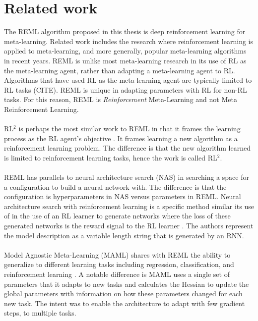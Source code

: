 \chapter{Related work}
\label{ch2}

\minitoc 
The REML algorithm proposed in this thesis is deep reinforcement 
learning for meta-learning. 
Related work includes the research where reinforcement learning is applied to 
meta-learning, and more generally, popular meta-learning algorithms in recent years. 
REML is unlike most meta-learning research in its use of RL as the meta-learning agent,
rather than adapting a meta-learning agent to RL. Algorithms that have used
RL as the meta-learning agent are typically limited to RL tasks (CITE). REML is 
unique in adapting parameters with RL for non-RL tasks. For this reason, REML is 
\textit{Reinforcement} Meta-Learning and not Meta Reinforcement Learning. 
\\\\
RL$^2$ is perhaps the most similar work to REML in that it frames the learning process
as the RL agent's objective \cite{DuaSchCheBarSutAbb:16}. It frames learning a new 
algorithm as a reinforcement learning problem. 
The difference is that the new algorithm learned is limited to reinforcement learning 
tasks, hence the work is called RL$^2$.
\\\\ 
REML has parallels to neural architecture search (NAS) in searching a space for
a configuration to build a neural network with. The difference is that the configuration
is hyperparameters in NAS versus parameters in REML. Neural architecture search with
reinforcement learning is a specific method similar its use of in the use of an RL learner
to generate networks where the loss of these generated networks is the reward 
signal to the RL learner \cite{ZophQuoc:16}. The authors represent the model description 
as a variable length string that is generated by an RNN. 
\\\\
Model Agnostic Meta-Learning (MAML) shares with REML the ability to generalize to different
learning tasks including regression, classification, and reinforcement learning 
\cite{FinAbbLev:17}. A notable difference is MAML uses a single set of parameters that
it adapts to new tasks and calculates the Hessian to update the global parameters with
information on how these parameters changed for each new task. The intent was to enable 
the architecture to adapt with few gradient steps, to multiple tasks. 



